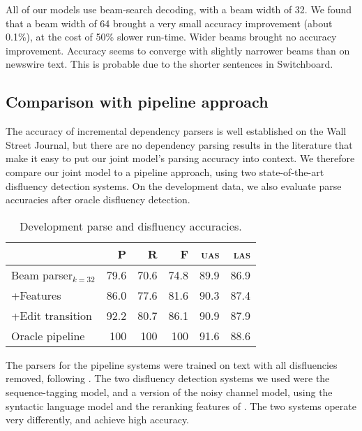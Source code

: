 \documentclass[11pt,letterpaper]{article}
\begin{document}
All of our models use beam-search decoding, with a beam width of 32. We found that
a beam width of 64 brought a very small accuracy improvement (about 0.1\%), at
the cost of 50\% slower run-time. Wider beams brought no accuracy improvement.
Accuracy seems to converge with slightly narrower beams than on newswire text.
This is probable due to the shorter sentences in Switchboard.


\subsection{Comparison with pipeline approach}
\label{sec:pipeline}
The accuracy of incremental dependency parsers is well established on the Wall
Street Journal, but there are no dependency parsing results in the literature
that make it easy to put our joint model's parsing accuracy into context.
We therefore compare our joint model to a pipeline approach, using two state-of-the-art
disfluency detection systems. On the development data, we also evaluate parse
accuracies after oracle disfluency detection.

\begin{table}
    \centering
    \small
    \begin{tabular}{l|rrr|rr}
        & P & R & F & \textsc{uas} & \textsc{las} \\
        \hline \hline
Beam parser$_{k=32}$  &	79.6	&	70.6	&	74.8	&	89.9	&	86.9 \\
+Features             &	86.0	&	77.6	&	81.6	&	90.3	&	87.4 \\
+Edit transition      &	92.2	&	80.7	&	86.1	&	90.9	&	87.9 \\
\hline       
Oracle pipeline  & 100 & 100 & 100 & 91.6    & 88.6 \\
\hline
    \end{tabular}
\caption{Development parse and disfluency accuracies.
\label{tab:dev}}
\end{table}


The parsers for the pipeline systems were trained on text with all disfluencies
removed, following \citet{Charniak01a}. 
The two disfluency detection systems we used were the \citet{qian:13} sequence-tagging
model, and a version of the \citet{Johnson04a} noisy channel model, using the
\citet{Charniak01b} syntactic language model and the reranking features of
\citet{zwarts:11}. The two systems operate very differently, and achieve high
accuracy.
\end{document}
